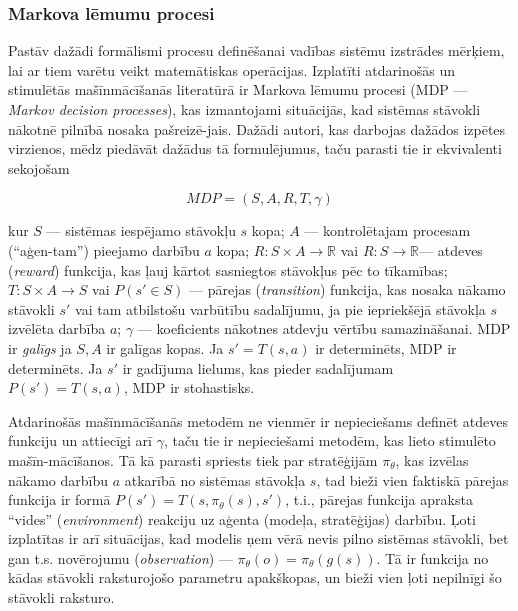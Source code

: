 \documentclass[12pt, a4paper]{article}
\numberwithin{equation}{section} %
\begin{document}
\subsubsection{Markova lēmumu procesi}

Pastāv dažādi formālismi procesu definēšanai vadības sistēmu izstrādes mērķiem, lai ar tiem varētu veikt matemātiskas operācijas. Izplatīti atdarinošās un stimulētās mašīnmācīšanās literatūrā ir Markova lēmumu procesi (MDP --- \textit{Markov decision processes}), kas izmantojami situācijās, kad sistēmas stāvokli nākotnē pilnībā nosaka pašreizē-jais. Dažādi autori, kas darbojas dažādos izpētes virzienos, mēdz piedāvāt dažādus tā formulējumus, taču parasti tie ir ekvivalenti sekojošam\cite{attia2018global}

\begin{equation} 
    MDP = (S,A,R,T, \gamma)
\end{equation}

kur $S$ --- sistēmas iespējamo stāvokļu $s$ kopa; $A$ --- kontrolētajam procesam (``aģen-tam'') pieejamo darbību $a$ kopa; $R: S \times A \rightarrow \mathbb{R}$ vai $R: S \rightarrow \mathbb{R}$--- atdeves (\textit{reward}) funkcija, kas ļauj kārtot sasniegtos stāvokļus pēc to tīkamības; $T: S \times A \rightarrow S$ vai $P(s' \in S)$ --- pārejas (\textit{transition}) funkcija, kas nosaka nākamo stāvokli $s'$ vai tam atbilstošu varbūtību sadalījumu, ja pie iepriekšējā stāvokļa $s$ izvēlēta darbība $a$; $\gamma$ --- koeficients nākotnes atdevju vērtību samazināšanai. MDP ir \textit{galīgs} ja $S,A$ ir galīgas kopas. Ja $s' = T(s,a)$ ir determinēts, MDP ir determinēts. Ja $s'$ ir gadījuma lielums, kas pieder sadalījumam $P(s')=T(s,a)$, MDP ir stohastisks.

Atdarinošās mašīnmācīšanās metodēm ne vienmēr ir nepieciešams definēt atdeves funkciju un attiecīgi arī $\gamma$, taču tie ir nepieciešami metodēm, kas lieto stimulēto mašīn-mācīšanos. Tā kā parasti spriests tiek par stratēģijām $\pi_{\theta}$, kas izvēlas nākamo darbību $a$ atkarībā no sistēmas stāvokļa $s$, tad bieži vien faktiskā pārejas funkcija ir formā $P(s') = T(s, \pi_{\theta}(s), s')$, t.i., pārejas funkcija apraksta ``vides'' (\textit{environment}) reakciju uz aģenta (modeļa, stratēģijas) darbību. Ļoti izplatītas ir arī situācijas, kad modelis ņem vērā nevis pilno sistēmas stāvokli, bet gan t.s. novērojumu (\textit{observation}) --- $\pi_{\theta}(o)=\pi_{\theta}(g(s))$. Tā ir funkcija no kādas stāvokli raksturojošo parametru apakškopas, un bieži vien ļoti nepilnīgi šo stāvokli raksturo. 
\end{document}
